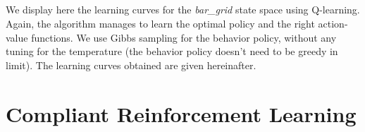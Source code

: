 \documentclass[a4paper]{report}
\begin{document}
{{{				\paragraph{} We display here the learning curves for the \emph{bar\_grid} state space using Q-learning. Again, the algorithm manages to learn the optimal policy and the right action-value functions. We use Gibbs sampling for the behavior policy, without any tuning for the temperature (the behavior policy doesn't need to be greedy in limit). The learning curves obtained are given hereinafter.

			}
		}
	}
	
	\chapter{Compliant Reinforcement Learning}
\end{document}
